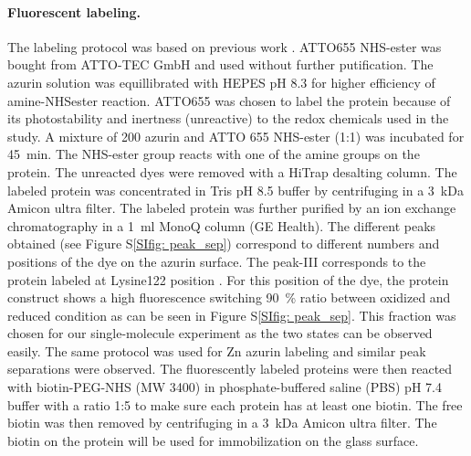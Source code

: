 \paragraph*{Fluorescent labeling.}
The labeling protocol was based on previous work \cite{nicolardi2012topdown}.
ATTO655 NHS-ester was bought from ATTO-TEC GmbH and used without further putification.
The azurin solution was equillibrated with HEPES pH 8.3 for higher efficiency of amine-NHSester reaction.
ATTO655 was chosen to label the protein because of its photostability and inertness (unreactive) to the redox chemicals used in the study.
A mixture of \SI{200}{\uM} azurin and ATTO 655 NHS-ester (1:1) was incubated for \SI{45}{\minute}.
The NHS-ester group reacts with one of the amine groups on the protein.
The unreacted dyes were removed with a HiTrap desalting column.
The labeled protein was concentrated in Tris pH 8.5 buffer by centrifuging in a \SI{3}{ kDa} Amicon ultra filter.
The labeled protein was further purified by an ion exchange chromatography in a \SI{1}{\ml} MonoQ column (GE Health).
The different peaks obtained (see Figure S\ref{SIfig: peak_sep}) correspond to different numbers and positions of the dye on the azurin surface. 
The peak-III corresponds to the protein labeled at Lysine122 position \cite{nicolardi2012topdown}.
For this position of the dye, the protein construct shows a high fluorescence switching \SI{90}{\percent} ratio between oxidized and reduced condition as can be seen in Figure S\ref{SIfig: peak_sep}. This fraction was chosen for our single-molecule experiment as the two states can be observed easily.
The same protocol was used for Zn azurin labeling and similar peak separations were observed.
The fluorescently labeled proteins were then reacted with biotin-PEG-NHS (MW 3400) in phosphate-buffered saline (PBS) pH 7.4 buffer with a ratio 1:5 to make sure each protein has at least one biotin.
The free biotin was then removed by centrifuging in a \SI{3}{ kDa} Amicon ultra filter.
The biotin on the protein will be used for immobilization on the glass surface.

